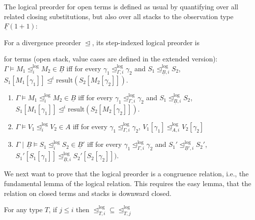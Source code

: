 \documentclass[acmsmall,screen,12pt]{acmart}
\renewcommand{\u}{\underline}
\newcommand{\pipe}{\,\,|\,\,}
\newcommand{\apreorder}{\trianglelefteq}
\newcommand{\ix}[2]{\mathrel{#1^{#2}}}
\newcommand{\itylrof}[3]{\ilrof{#1}{#3,#2}}
\newcommand{\ilrof}[2]{\mathrel{{#1}^{\text{log}}_{#2}}}
\newcommand{\result}{\text{result}}
\begin{document}
{The logical preorder for open terms is defined as usual by quantifying
over all related closing substitutions, but also over all stacks to the
observation type $\u F (1+1)$:
%
\begin{definition}
  For a divergence preorder $\apreorder$, its step-indexed logical
  preorder is
  \begin{shortonly}
    for terms (open stack, value cases are defined in the extended version):
    $\Gamma \vDash M_1 \ilrof\apreorder{i} M_2 \in \u B$ iff for every $\gamma_1 \itylrof\apreorder i {\Gamma} \gamma_2$ and $S_1
    \itylrof\apreorder i {\u B} S_2$, $S_1[M_1[\gamma_1]] \ix\apreorder
    i \result(S_2[M_2[\gamma_2]])$.
  \end{shortonly}
  \begin{longonly}
  \begin{enumerate}
  \item $\Gamma \vDash M_1 \ilrof\apreorder{i} M_2 \in \u B$ iff for every $\gamma_1 \itylrof\apreorder i {\Gamma} \gamma_2$ and $S_1
    \itylrof\apreorder i {\u B} S_2$, $S_1[M_1[\gamma_1]] \ix\apreorder
    i \result(S_2[M_2[\gamma_2]])$.
  \item $\Gamma \vDash V_1 \ilrof\apreorder{i} V_2 \in A$ iff
    for every $\gamma_1 \itylrof\apreorder i {\Gamma} \gamma_2$, $V_1[\gamma_1] \itylrof\apreorder i A V_2[\gamma_2]$
  \item $\Gamma \pipe \u B \vDash S_1 \ilrof\apreorder{i} S_2 \in \u B'$ 
    iff for every $\gamma_1 \itylrof\apreorder i {\Gamma} \gamma_2$ and
    $S_1' \itylrof\apreorder i {\u B'} S_2'$, $S_1'[S_1[\gamma_1]] \itylrof \apreorder
    i {\u B} S_2'[S_2[\gamma_2]])$.
  \end{enumerate}    
  \end{longonly}
\end{definition}

\begin{longonly}
We next want to prove that the logical preorder is a congruence
relation, i.e., the fundamental lemma of the logical relation.
%
This requires the easy lemma, that the relation on closed terms and
stacks is downward closed.
\begin{lemma}
  For any type $T$, if $j \leq i$ then $\itylrof\apreorder i T
  \subseteq \itylrof\apreorder j T$
\end{lemma}
\end{longonly}

}
\end{document}
